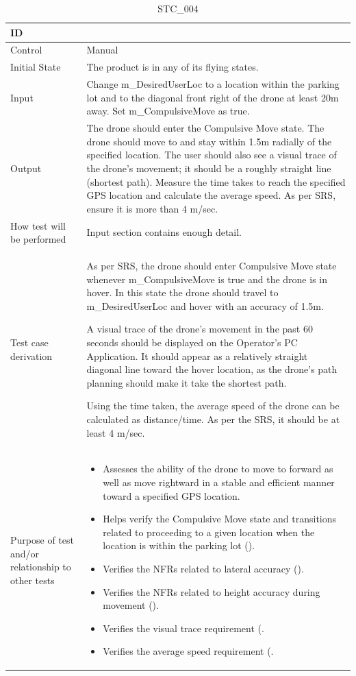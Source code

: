\documentclass[12pt, titlepage]{article}
\begin{document}
\begin{table}[!h]
\begin{center}
\caption {STC\_004}
\label{tab:STC_004}
\begin{tabular}{ | m{3.2cm} | m{12.2cm} | } 
\hline
ID & \nameref{tab:STC_004} \\ 
\hline
Control & Manual \\ 
\hline
Initial State & The product is in any of its flying states.   \\ 
\hline
Input &  Change m\_DesiredUserLoc to a location within the parking lot and to the diagonal front right of the drone at least 20m away. Set m\_CompulsiveMove as true. \\ 
\hline
Output & The drone should enter the Compulsive Move state. The drone should move to and stay within 1.5m radially of the specified location. 
The user should also see a visual trace of the drone's movement; it should be a roughly straight line (shortest path).
Measure the time takes to reach the specified GPS location and calculate the average speed. As per SRS, ensure it is more than 4 m/sec.  \\ 
\hline
How test will be performed & Input section contains enough detail. \\ 
\hline
Test case derivation & As per SRS, the drone should enter Compulsive Move state whenever m\_CompulsiveMove is true and the drone is in hover. In this state the drone should travel to m\_DesiredUserLoc and hover with an accuracy of 1.5m. 

A visual trace of the drone's movement in the past 60 seconds should be displayed on the Operator's PC Application. It should appear as a relatively straight diagonal line toward the hover location, as the drone's path planning should make it take the shortest path. 

Using the time taken, the average speed of the drone can be calculated as distance/time. As per the SRS, it should be at least 4 m/sec. 
 \\ 
\hline
Purpose of test and/or relationship to other tests & 
\begin{itemize}
    \item Assesses the ability of the drone to move to forward as well as move rightward in a stable and efficient manner toward a specified GPS location.
    \item Helps verify the Compulsive Move state and transitions related to proceeding to a given location when the location is within the parking lot (\nameref{STA_011}).
    \item Verifies the NFRs related to lateral accuracy (\nameref{PERF_008}). 
    \item Verifies the NFRs related to height accuracy during movement (\nameref{PERF_006}). 
    \item Verifies the visual trace requirement (\nameref{USE_001}. 
    \item Verifies the average speed requirement (\nameref{PERF_003}. 
\end{itemize}
\\ 
\hline
\end{tabular}
\end{center}
\end{table}
\end{document}
